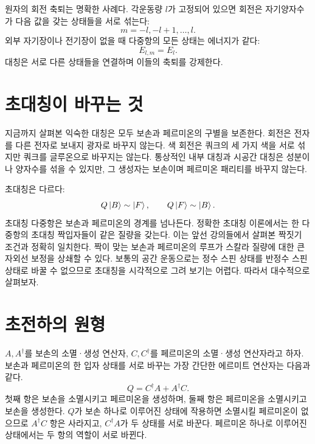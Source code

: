 원자의 회전 축퇴는 명확한 사례다. 각운동량 \(l\)가 고정되어 있으면 회전은 자기양자수가 다음 값을 갖는 상태들을 서로 섞는다:
\begin{equation}
m=-l,-l+1,\ldots,l.
\end{equation}
외부 자기장이나 전기장이 없을 때 다중항의 모든 상태는 에너지가 같다:
\begin{equation}
E_{l,m}=E_l.
\end{equation}
대칭은 서로 다른 상태들을 연결하며 이들의 축퇴를 강제한다.

\section{초대칭이 바꾸는 것}

지금까지 살펴본 익숙한 대칭은 모두 보손과 페르미온의 구별을 보존한다. 회전은 전자를 다른 전자로 보내지 광자로 바꾸지 않는다. 색 회전은 쿼크의 세 가지 색을 서로 섞지만 쿼크를 글루온으로 바꾸지는 않는다. 통상적인 내부 대칭과 시공간 대칭은 성분이나 양자수를 섞을 수 있지만, 그 생성자는 보손이며 페르미온 패리티를 바꾸지 않는다.

초대칭은 다르다:
\begin{equation}
Q\left\lvert B\right\rangle\sim\left\lvert F\right\rangle,
\qquad
Q\left\lvert F\right\rangle\sim\left\lvert B\right\rangle.
\end{equation}
초대칭 다중항은 보손과 페르미온의 경계를 넘나든다. 정확한 초대칭 이론에서는 한 다중항의 초대칭 짝입자들이 같은 질량을 갖는다. 이는 앞선 강의들에서 살펴본 짝짓기 조건과 정확히 일치한다. 짝이 맞는 보손과 페르미온의 루프가 스칼라 질량에 대한 큰 자외선 보정을 상쇄할 수 있다. 보통의 공간 운동으로는 정수 스핀 상태를 반정수 스핀 상태로 바꿀 수 없으므로 초대칭을 시각적으로 그려 보기는 어렵다. 따라서 대수적으로 살펴보자.

\section{초전하의 원형}

\(A,A^\dagger\)를 보손의 소멸·생성 연산자, \(C,C^\dagger\)를 페르미온의 소멸·생성 연산자라고 하자. 보손과 페르미온의 한 입자 상태를 서로 바꾸는 가장 간단한 에르미트 연산자는 다음과 같다.
\begin{equation}
Q=C^\dagger A+A^\dagger C.
\end{equation}
첫째 항은 보손을 소멸시키고 페르미온을 생성하며, 둘째 항은 페르미온을 소멸시키고 보손을 생성한다. \(Q\)가 보손 하나로 이루어진 상태에 작용하면 소멸시킬 페르미온이 없으므로 \(A^\dagger C\) 항은 사라지고, \(C^\dagger A\)가 두 상태를 서로 바꾼다. 페르미온 하나로 이루어진 상태에서는 두 항의 역할이 서로 바뀐다.

